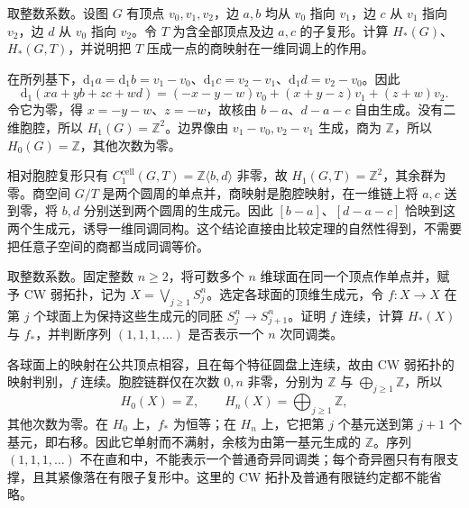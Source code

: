 \begin{exercise}\label{g2:ex:cellular-graph-tree}
	取整数系数。设图 \(G\) 有顶点 \(v_0,v_1,v_2\)，边 \(a,b\) 均从 \(v_0\) 指向 \(v_1\)，边 \(c\) 从 \(v_1\) 指向 \(v_2\)，边 \(d\) 从 \(v_0\) 指向 \(v_2\)。令 \(T\) 为含全部顶点及边 \(a,c\) 的子复形。计算 \(H_*(G)\)、\(H_*(G,T)\)，并说明把 \(T\) 压成一点的商映射在一维同调上的作用。
\end{exercise}
\begin{solution}
	在所列基下，\(\mathrm{d}_1a=\mathrm{d}_1b=v_1-v_0\)、\(\mathrm{d}_1c=v_2-v_1\)、\(\mathrm{d}_1d=v_2-v_0\)。因此
	\[
		\mathrm{d}_1(xa+yb+zc+wd)=(-x-y-w)v_0+(x+y-z)v_1+(z+w)v_2.
	\]
	令它为零，得 \(x=-y-w\)、\(z=-w\)，故核由 \(b-a\)、\(d-a-c\) 自由生成。没有二维胞腔，所以 \(H_1(G)=\mathbb Z^2\)。边界像由 \(v_1-v_0,v_2-v_1\) 生成，商为 \(\mathbb Z\)，所以 \(H_0(G)=\mathbb Z\)，其他次数为零。

	相对胞腔复形只有 \(C_1^{\mathrm{cell}}(G,T)=\mathbb Z\langle b,d\rangle\) 非零，故 \(H_1(G,T)=\mathbb Z^2\)，其余群为零。商空间 \(G/T\) 是两个圆周的单点并，商映射是胞腔映射，在一维链上将 \(a,c\) 送到零，将 \(b,d\) 分别送到两个圆周的生成元。因此 \([b-a]\)、\([d-a-c]\) 恰映到这两个生成元，诱导一维同调同构。这个结论直接由比较定理的自然性得到，不需要把任意子空间的商都当成同调等价。
\end{solution}

\begin{exercise}\label{g2:ex:infinite-cellular-shift}
	取整数系数。固定整数 \(n\ge2\)，将可数多个 \(n\) 维球面在同一个顶点作单点并，赋予 CW 弱拓扑，记为 \(X=\bigvee_{j\ge1}S_j^n\)。选定各球面的顶维生成元，令 \(f:X\to X\) 在第 \(j\) 个球面上为保持这些生成元的同胚 \(S_j^n\to S_{j+1}^n\)。证明 \(f\) 连续，计算 \(H_*(X)\) 与 \(f_*\)，并判断序列 \((1,1,1,\ldots)\) 是否表示一个 \(n\) 次同调类。
\end{exercise}
\begin{solution}
	各球面上的映射在公共顶点相容，且在每个特征圆盘上连续，故由 CW 弱拓扑的映射判别，\(f\) 连续。胞腔链群仅在次数 \(0,n\) 非零，分别为 \(\mathbb Z\) 与 \(\bigoplus_{j\ge1}\mathbb Z\)，所以
	\[
		H_0(X)=\mathbb Z,\qquad H_n(X)=\bigoplus_{j\ge1}\mathbb Z,
	\]
	其他次数为零。在 \(H_0\) 上，\(f_*\) 为恒等；在 \(H_n\) 上，它把第 \(j\) 个基元送到第 \(j+1\) 个基元，即右移。因此它单射而不满射，余核为由第一基元生成的 \(\mathbb Z\)。序列 \((1,1,1,\ldots)\) 不在直和中，不能表示一个普通奇异同调类；每个奇异圈只有有限支撑，且其紧像落在有限子复形中。这里的 CW 拓扑及普通有限链约定都不能省略。
\end{solution}

